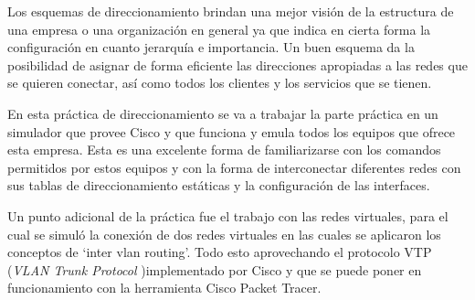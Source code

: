 Los esquemas de direccionamiento brindan una mejor visión de la estructura de una empresa o una
organización en general ya que indica en cierta forma la configuración en cuanto jerarquía e
importancia. Un buen esquema da la posibilidad de asignar de forma eficiente las direcciones apropiadas
a las redes que se quieren conectar, así como todos los clientes y los servicios que se tienen.

En esta práctica de direccionamiento se va a trabajar la parte práctica en un simulador que provee Cisco
y que funciona y emula todos los equipos que ofrece esta empresa. Esta es una excelente forma de
familiarizarse con los comandos permitidos por estos equipos y con la forma de interconectar diferentes
redes con sus tablas de direccionamiento estáticas y la configuración de las interfaces.

Un punto adicional de la práctica fue el trabajo con las redes virtuales, para el cual se simuló la conexión
de dos redes virtuales en las cuales se aplicaron los conceptos de `inter vlan routing'. Todo esto aprovechando
el protocolo VTP ({\em VLAN Trunk Protocol} \cite{VTP})implementado por Cisco y que se puede poner en funcionamiento con la herramienta Cisco
Packet Tracer\cite{PT}.